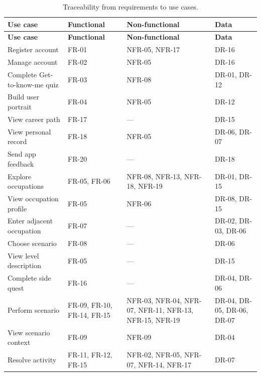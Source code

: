 {\small{}\renewcommand{\arraystretch}{1.1}
\begin{longtable}{|>{\raggedright\arraybackslash}p{}|>{\raggedright\arraybackslash}p{}|>{\raggedright\arraybackslash}p{}|>{\raggedright\arraybackslash}p{}|}
\caption{Traceability from requirements to use cases.} \\
\hline
\textbf{Use case} & \textbf{Functional} & \textbf{Non-\allowbreak{}functional} & \textbf{Data} \\ \hline
\endfirsthead
\hline
\textbf{Use case} & \textbf{Functional} & \textbf{Non-\allowbreak{}functional} & \textbf{Data} \\ \hline
\endhead
Register account & FR-01 & NFR-05, NFR-17 & DR-16 \\ \hline
Manage account & FR-02 & NFR-05 & DR-16 \\ \hline
Complete Get-\allowbreak{}to-\allowbreak{}know-\allowbreak{}me quiz & FR-03 & NFR-08 & DR-01, DR-12 \\ \hline
Build user portrait & FR-04 & NFR-05 & DR-12 \\ \hline
View career path & FR-17 & --- & DR-15 \\ \hline
View personal record & FR-18 & NFR-05 & DR-06, DR-07 \\ \hline
Send app feedback & FR-20 & --- & DR-18 \\ \hline
Explore occupations & FR-05, FR-06 & NFR-08, NFR-13, NFR-18, NFR-19 & DR-01, DR-15 \\ \hline
View occupation profile & FR-05 & NFR-06 & DR-08, DR-15 \\ \hline
Enter adjacent occupation & FR-07 & --- & DR-02, DR-03, DR-06 \\ \hline
Choose scenario & FR-08 & --- & DR-06 \\ \hline
View level description & FR-05 & --- & DR-15 \\ \hline
Complete side quest & FR-16 & --- & DR-04, DR-06 \\ \hline
Perform scenario & FR-09, FR-10, FR-14, FR-15 & NFR-03, NFR-04, NFR-07, NFR-11, NFR-13, NFR-15, NFR-19 & DR-04, DR-05, DR-06, DR-07 \\ \hline
View scenario context & FR-09 & NFR-09 & DR-04 \\ \hline
Resolve activity & FR-11, FR-12, FR-15 & NFR-02, NFR-05, NFR-07, NFR-14, NFR-17 & DR-07 \\ \hline

\end{longtable}}

